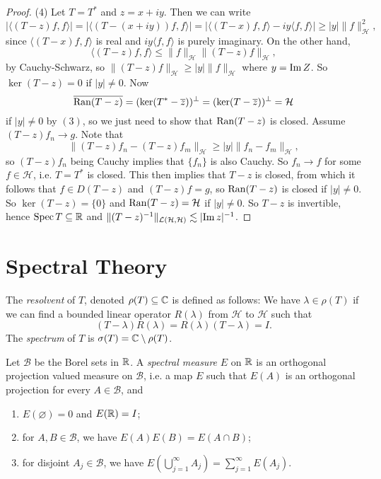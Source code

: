 \begin{proof}
  (4) Let $T = T^*$ and $z = x + iy$. Then we can write
  \[
    |\langle (T - z) f, f \rangle|
    = |\langle (T - (x + iy)) f, f \rangle|
    = |\langle (T - x) f, f \rangle
    - iy \langle f, f \rangle|
    \ge |y| \|f\|_{\mathcal{H}}^2,
  \]
  since $\langle (T - x) f, f \rangle$ is real and
  $iy \langle f, f \rangle$ is purely imaginary. On the
  other hand,
  \[
    \langle (T - z) f, f \rangle
    \le \|f\|_{\mathcal{H}} \|(T - z) f\|_{\mathcal{H}},
  \]
  by Cauchy-Schwarz, so $\|(T - z) f\|_{\mathcal{H}} \ge |y| \|f\|_{\mathcal{H}}$
  where $y = \operatorname{Im} Z$. So $\ker(T - z) = 0$ if $|y| \ne 0$.
  Now
  \[
    \overline{\operatorname{Ran}(T - z)} = (\ker (T^* - \overline{z}))^\perp
    = (\ker (T - \overline{z}))^\perp
    = \mathcal{H}
  \]
  if $|y| \ne 0$ by $(3)$, so we just need to show that
  $\operatorname{Ran}(T - z)$ is closed. Assume $(T - z) f_n \to g$.
  Note that
  \[
    \|(T - z) f_n - (T - z) f_m\|_{\mathcal{H}}
    \ge |y| \|f_n - f_m \|_{\mathcal{H}},
  \]
  so $(T - z) f_n$  being Cauchy implies that
  $\{f_n\}$ is also Cauchy. So $f_n \to f$ for some
  $f \in \mathcal{H}$, i.e. $T = T^*$ is closed.
  This then implies that $T - z$ is closed, from which it
  follows that $f \in D(T - z)$ and $(T - z)f = g$, so
  $\operatorname{Ran}(T - z)$ is closed if $|y| \ne 0$. So
  $\ker(T - z) = \{0\}$ and $\operatorname{Ran}(T - z) = \mathcal{H}$
  if $|y| \ne 0$. So $T - z$ is invertible, hence
  $\operatorname{Spec} T \subseteq \mathbb{R}$ and
  $\|(T - z)^{-1}\|_{\mathcal{L}(\mathcal{H}, \mathcal{H})} \lesssim |{\operatorname{Im} z}|^{-1}$.
\end{proof}

\section{Spectral Theory}

\begin{definition}
  The \emph{resolvent} of $T$, denoted $\rho(T) \subseteq \mathbb{C}$
  is defined as follows: We
  have $\lambda \in \rho(T)$ if we can find a bounded
  linear operator $R(\lambda)$ from $\mathcal{H}$ to
  $\mathcal{H}$ such that
  \[
    (T - \lambda) R(\lambda) = R(\lambda)(T - \lambda) = I.
  \]
  The \emph{spectrum} of $T$ is $\sigma(T) = \mathbb{C} \setminus \rho(T)$.
\end{definition}

\begin{definition}
  Let $\mathcal{B}$ be the Borel sets in $\mathbb{R}$.
  A \emph{spectral measure} $E$ on $\mathbb{R}$ is an orthogonal
  projection valued measure on $\mathcal{B}$, i.e.
  a map $E$ such that $E(A)$ is an orthogonal projection
  for every $A \in \mathcal{B}$, and
  \begin{enumerate}
    \item $E(\varnothing) = 0$ and $E(\mathbb{R}) = I$;
    \item for $A, B \in \mathcal{B}$, we have
      $E(A) E(B) = E(A \cap B)$;
    \item for disjoint $A_j \in \mathcal{B}$, we have
      $E(\bigcup_{j = 1}^\infty A_j) = \sum_{j = 1}^\infty E(A_j)$.
  \end{enumerate}
\end{definition}

